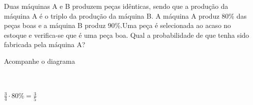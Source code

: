 \begin{ex}
 Duas máquinas A e B produzem peças idênticas, sendo que a produção da máquina A é o triplo da produção da máquina B. A máquina A produz 80\% das peças boas e a máquina B produz 90\%.Uma peça é selecionada ao acaso no estoque e verifica-se que é uma peça boa. Qual a probabilidade de que tenha sido fabricada pela máquina A?
 
   \begin{sol}
    Acompanhe o diagrama
    \\
    \\
        \\
        $\frac{3}{4}\cdot80\%=\frac{3}{5}$
        
  \end{sol}
\end{ex}